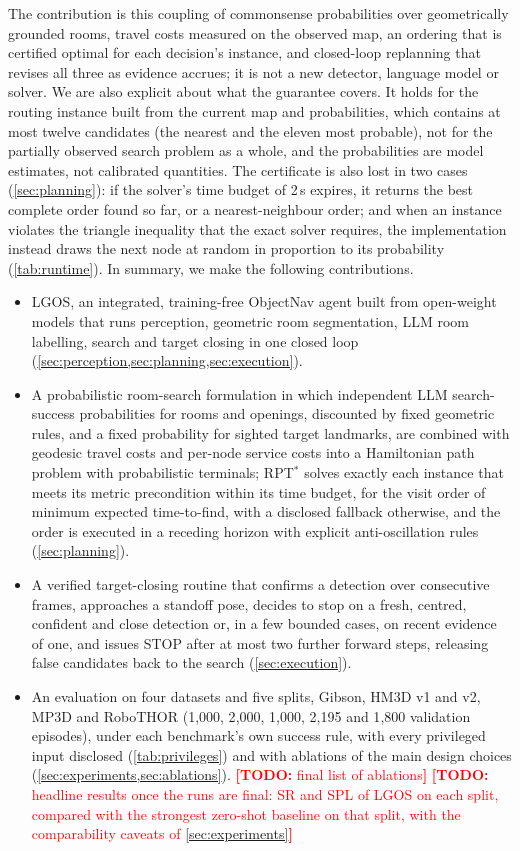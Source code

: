 \documentclass[10pt]{article}
\newcommand{\TODO}[1]{\textcolor{red}{\textbf{[TODO:} #1\textbf{]}}}
\newcommand{\ours}{LGOS\xspace}
\newcommand{\SR}{\textsc{SR}\xspace}
\newcommand{\SPL}{\textsc{SPL}\xspace}
\begin{document}
The contribution is this coupling of commonsense probabilities over geometrically grounded rooms, travel costs
measured on the observed map, an ordering that is certified optimal for each decision's instance, and closed-loop
replanning that revises all three as evidence accrues; it is not a new detector, language model or solver. We are
also explicit about what the guarantee covers. It holds for the routing instance built from the current map and
probabilities, which contains at most twelve candidates (the nearest and the eleven most probable), not for the
partially observed search problem as a whole, and the probabilities are model estimates, not calibrated
quantities. The certificate is also lost in two cases (\cref{sec:planning}): if the solver's time budget of 2\,s
expires, it returns the best complete order found so far, or a nearest-neighbour order; and when an instance violates the triangle inequality that the
exact solver requires, the implementation instead draws the next node at random in proportion to its probability
(\cref{tab:runtime}). In summary, we make the following contributions.
\begin{itemize}[leftmargin=*,itemsep=2pt]
  \item \ours, an integrated, training-free ObjectNav agent built from open-weight models that runs perception,
  geometric room segmentation, LLM room labelling, search and target closing in one closed loop
  (\cref{sec:perception,sec:planning,sec:execution}).
  \item A probabilistic room-search formulation in which independent LLM search-success probabilities for rooms
  and openings, discounted by fixed geometric rules, and a fixed probability for sighted target landmarks, are combined with geodesic travel costs and
  per-node service costs into a Hamiltonian path problem with probabilistic terminals; RPT$^*$ solves exactly
  each instance that meets its metric precondition within its time budget, for the visit order of minimum expected
  time-to-find, with a disclosed fallback otherwise, and the order is executed in a receding horizon with explicit
  anti-oscillation rules (\cref{sec:planning}).
  \item A verified target-closing routine that confirms a detection over consecutive frames, approaches a standoff
  pose, decides to stop on a fresh, centred, confident and close detection or, in a few bounded cases, on recent
  evidence of one, and issues STOP after at most two further forward steps, releasing false candidates back to the search (\cref{sec:execution}).
  \item An evaluation on four datasets and five splits, Gibson, HM3D v1 and v2, MP3D and RoboTHOR (1{,}000, 2{,}000,
  1{,}000, 2{,}195 and 1{,}800 validation episodes), under each benchmark's own success rule, with every privileged
  input disclosed (\cref{tab:privileges}) and with ablations of the main design choices
  (\cref{sec:experiments,sec:ablations}). \TODO{final list of ablations} \TODO{headline results once the runs
  are final: \SR and \SPL of \ours on each split, compared with the strongest zero-shot baseline on that split,
  with the comparability caveats of \cref{sec:experiments}}
\end{itemize}
\end{document}
